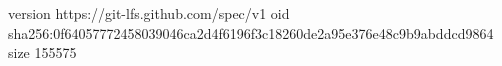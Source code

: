 version https://git-lfs.github.com/spec/v1
oid sha256:0f64057772458039046ca2d4f6196f3c18260de2a95e376e48c9b9abddcd9864
size 155575

